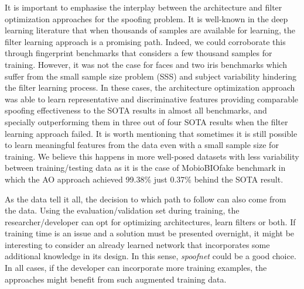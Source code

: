 It is important to emphasise the interplay between the architecture and filter optimization approaches for the spoofing problem.
It is well-known in the deep learning literature that when thousands of samples are available for learning, the filter learning approach is a promising path. Indeed, we could corroborate this through fingerprint benchmarks that considers a few thousand samples for training. However, it was not the case for faces and two iris benchmarks which suffer from the small sample size problem (SSS) and subject variability hindering the filter learning process. In these cases, the architecture optimization approach was able to learn representative and discriminative features providing comparable spoofing effectiveness to the SOTA results in almost all benchmarks, and specially outperforming them in three out of four SOTA results when the filter learning approach failed. It is worth mentioning that sometimes it is still possible to learn meaningful features from the data even with a small sample size for training. We believe this happens in more well-posed datasets with less variability between training/testing data as it is the case of MobioBIOfake benchmark in which the AO approach achieved 99.38\% just 0.37\% behind the SOTA result. 

As the data tell it all, the decision to which path to follow can also come from the data. Using the evaluation/validation set during training, the researcher/developer can opt for optimizing architectures, learn filters or both. If training time is an issue and a solution must be presented overnight, it might be interesting to consider an already learned network that incorporates some additional knowledge in its design. In this sense, \emph{spoofnet} could be a good choice. In all cases, if the developer can incorporate more training examples, the approaches might benefit from such augmented training data. 


